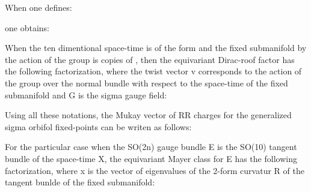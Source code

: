 \documentclass[a4paper,a4paper]{article}
\begin{document}
When one defines:

\begin{center}
{  \coordHE{} }
\end{center}

one obtains:

\begin{center}
{  \coordHE{} }
\end{center}

When the ten dimentional space-time is of the form \coordHE{} and the fixed submanifold by the action of the group \coordHE{} is \coordHE{} copies of \coordHE{}   , then the equivariant Dirac-roof factor has the following factorization, where the twist vector v corresponds to the action of the group \coordHE{} over the normal bundle with respect to the space-time of the fixed submanifold and G is the sigma gauge field:

\begin{center}
{  \coordHE{} }
\end{center}

Using all these notations, the Mukay vector of RR charges for the generalized sigma orbifol fixed-points can be writen as follows:

\begin{center}
{  \coordHE{} }
\end{center} 

For the particular case when the SO(2n) gauge bundle E is the SO(10) tangent bundle of the space-time X, the equivariant Mayer class for E has the following factorization, where x is the vector of eigenvalues of the 2-form curvatur R of the tangent bunlde of the fixed submanifold:

\begin{center}
{  \coordHE{} }
\end{center}
\end{document}

